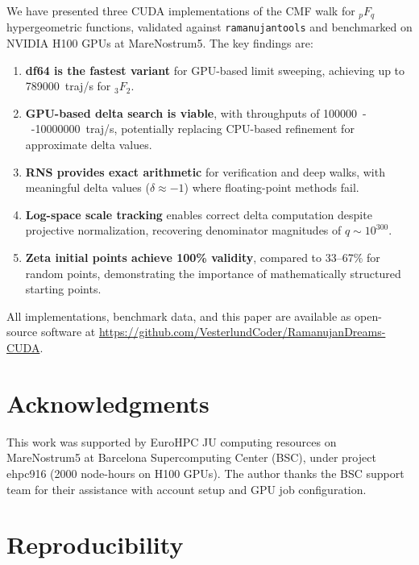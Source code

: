 \documentclass[11pt,a4paper]{article}
\begin{document}
We have presented three CUDA implementations of the CMF walk for ${}_pF_q$
hypergeometric functions, validated against \texttt{ramanujantools} and
benchmarked on NVIDIA H100 GPUs at MareNostrum5. The key findings are:

\begin{enumerate}[leftmargin=1.5cm]
    \item \textbf{df64 is the fastest variant} for GPU-based limit
    sweeping, achieving up to \SI{789000}{traj/s} for ${}_3F_2$.

    \item \textbf{GPU-based delta search is viable}, with throughputs of
    \SI{100000}{--}\SI{10000000}{traj/s}, potentially replacing CPU-based
    refinement for approximate delta values.

    \item \textbf{RNS provides exact arithmetic} for verification and
    deep walks, with meaningful delta values ($\delta \approx -1$) where
    floating-point methods fail.

    \item \textbf{Log-space scale tracking} enables correct delta
    computation despite projective normalization, recovering denominator
    magnitudes of $q \sim 10^{300}$.

    \item \textbf{Zeta initial points achieve 100\% validity}, compared
    to 33--67\% for random points, demonstrating the importance of
    mathematically structured starting points.
\end{enumerate}

All implementations, benchmark data, and this paper are available as
open-source software at
\url{https://github.com/VesterlundCoder/RamanujanDreams-CUDA}.

\section*{Acknowledgments}

This work was supported by EuroHPC JU computing resources on MareNostrum5
at Barcelona Supercomputing Center (BSC), under project ehpc916
(2000 node-hours on H100 GPUs). The author thanks the BSC support team
for their assistance with account setup and GPU job configuration.

\section*{Reproducibility}
\end{document}
